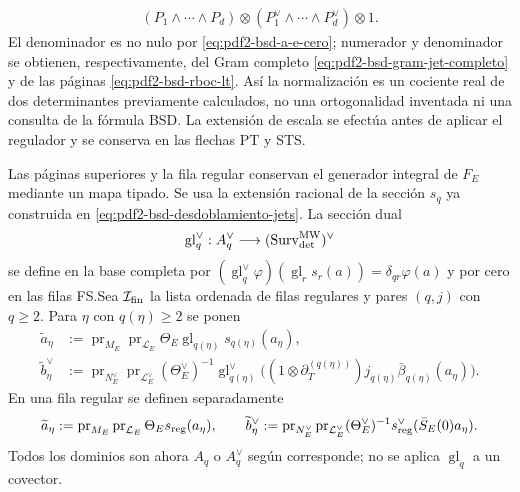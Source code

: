 \begin{proposition}
\begin{equation}
\begin{aligned}
 (P_1\wedge\cdots\wedge P_d)
 \otimes(P_1^\vee\wedge\cdots\wedge P_d^\vee)\otimes1.
 \end{aligned}
\end{equation}
El denominador es no nulo por \eqref{eq:pdf2-bsd-a-e-cero}; numerador y
denominador se obtienen, respectivamente, del Gram completo
\eqref{eq:pdf2-bsd-gram-jet-completo} y de las páginas
\eqref{eq:pdf2-bsd-rboc-lt}. Así la normalización es un cociente real de dos
determinantes previamente calculados, no una ortogonalidad inventada ni una
consulta de la fórmula BSD. La extensión de escala se efectúa antes de
aplicar el regulador y se conserva en las flechas PT y STS.

Las páginas superiores y la fila regular conservan el generador integral de
$F_E$ mediante un mapa tipado. Se usa la extensión racional de la sección
$s_q$ ya construida en \eqref{eq:pdf2-bsd-desdoblamiento-jets}. La sección dual
\begin{equation}\label{eq:pdf2-bsd-glue-dual-tipado}
 \operatorname{gl}_q^\vee:A_q^\vee\longrightarrow
   (\operatorname{Surv}_{\rm det}^{\rm MW})^\vee
\end{equation}
se define en la base completa por
$(\operatorname{gl}_q^\vee\varphi)
(\operatorname{gl}_r s_r(a))=\delta_{qr}\varphi(a)$ y por cero en las filas
FS.\@ Sea $\mathcal I_{\rm fin}$ la lista ordenada de filas regulares y pares
$(q,j)$ con $q\geq2$. Para $\eta$ con $q(\eta)\geq2$ se ponen
\begin{equation}\label{eq:pdf2-bsd-lifts-filas-smith}
 \begin{aligned}
 \widetilde a_\eta&:=\operatorname{pr}_{M_E}\operatorname{pr}_{\mathcal L_E}
   \Theta_E\operatorname{gl}_{q(\eta)}s_{q(\eta)}(a_\eta),\\
 \widetilde b_\eta^\vee&:=
   \operatorname{pr}_{N_E^\vee}\operatorname{pr}_{\mathcal L_E^\vee}
   (\Theta_E^\vee)^{-1}\operatorname{gl}_{q(\eta)}^\vee
   \bigl((1\otimes\partial_T^{(q(\eta))})
      j_{q(\eta)}\bar\beta_{q(\eta)}(a_\eta)\bigr).
 \end{aligned}
\end{equation}
En una fila regular se definen separadamente
\begin{equation}\label{eq:pdf2-bsd-lifts-fila-regular}
 \widetilde a_\eta:=
 \operatorname{pr}_{M_E}\operatorname{pr}_{\mathcal L_E}
 \Theta_Es_{\rm reg}(a_\eta),
 \qquad
 \widetilde b_\eta^\vee:=
 \operatorname{pr}_{N_E^\vee}\operatorname{pr}_{\mathcal L_E^\vee}
 (\Theta_E^\vee)^{-1}s_{\rm reg}^\vee
 (\bar S_E(0)a_\eta).
\end{equation}
Todos los dominios son ahora $A_q$ o $A_q^\vee$ según corresponde; no se
aplica $\operatorname{gl}_q$ a un covector.


\end{proposition}
